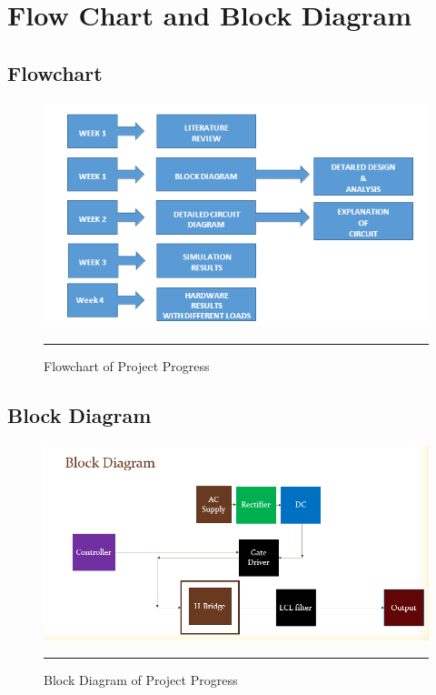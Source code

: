 
\chapter{Flow Chart and Block Diagram} %
\label{Chapter2}
\section{Flowchart}

\begin{figure}[htbp]
	\centering
		\includegraphics[width = 7in]{./Figures/Presentation1.png}
		\rule{35em}{5pt}
	\caption{Flowchart of Project Progress}
	\label{fig:1}
\end{figure}
\newpage
\section{Block Diagram}
\begin{figure}[htbp]
	\centering
		\includegraphics[width = 5in]{./Figures/block.png}
		\rule{35em}{5pt}
	\caption{Block Diagram of Project Progress}
	\label{fig:2}
\end{figure}